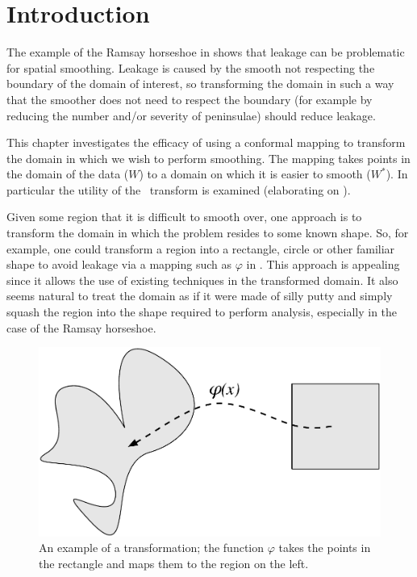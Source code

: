 \label{chap-sc}
\section{Introduction}

The example of the Ramsay horseshoe in  shows that leakage can be problematic for spatial smoothing. Leakage is caused by the smooth not respecting the boundary of the domain of interest, so transforming the domain in such a way that the smoother does not need to respect the boundary (for example by reducing the number and/or severity of peninsulae) should reduce leakage.

This chapter investigates the efficacy of using a conformal mapping to transform the domain in which we wish to perform smoothing. The mapping takes points in the domain of the data ($W$) to a domain on which it is easier to smooth ($W^*$). In particular the utility of the \sch\ transform is examined (elaborating on \cite{eilerstalk}).

Given some region that it is difficult to smooth over, one approach is to transform the domain in which the problem resides to some known shape. So, for example, one could transform a region into a rectangle, circle or other familiar shape to avoid leakage via a mapping such as $\varphi$ in . This approach is appealing since it allows the use of existing techniques in the transformed domain. It also seems natural to treat the domain as if it were made of silly putty and simply squash the region into the shape required to perform analysis, especially in the case of the Ramsay horseshoe.

\begin{figure} [t]
\centering
\includegraphics[scale=0.3]{sc/figs/simpledia.pdf}
\caption{An example of a transformation; the function $\varphi$ takes the points in the rectangle and maps them to the region on the left.}
\label{simpledia}
\end{figure}

